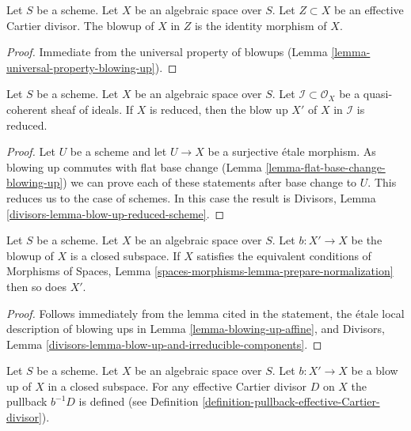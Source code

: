 \begin{lemma}
\label{lemma-blow-up-effective-Cartier-divisor}
Let $S$ be a scheme. Let $X$ be an algebraic space over $S$.
Let $Z \subset X$ be an effective Cartier divisor.
The blowup of $X$ in $Z$ is the identity morphism of $X$.
\end{lemma}

\begin{proof}
Immediate from the universal property of blowups
(Lemma \ref{lemma-universal-property-blowing-up}).
\end{proof}

\begin{lemma}
\label{lemma-blow-up-reduced-space}
Let $S$ be a scheme. Let $X$ be an algebraic space over $S$.
Let $\mathcal{I} \subset \mathcal{O}_X$ be a
quasi-coherent sheaf of ideals. If $X$ is reduced, then the
blow up $X'$ of $X$ in $\mathcal{I}$ is reduced.
\end{lemma}

\begin{proof}
Let $U$ be a scheme and let $U \to X$ be a surjective \'etale morphism.
As blowing up commutes with flat base change
(Lemma \ref{lemma-flat-base-change-blowing-up})
we can prove each of these statements after base change to $U$.
This reduces us to the case of schemes.
In this case the result is
Divisors, Lemma \ref{divisors-lemma-blow-up-reduced-scheme}.
\end{proof}

\begin{lemma}
\label{lemma-blowup-finite-nr-irreducibles}
Let $S$ be a scheme. Let $X$ be an algebraic space over $S$. Let
$b : X' \to X$ be the blowup of $X$ is a closed subspace. If
$X$ satisfies the equivalent conditions of
Morphisms of Spaces, Lemma \ref{spaces-morphisms-lemma-prepare-normalization}
then so does $X'$.
\end{lemma}

\begin{proof}
Follows immediately from the lemma cited in the statement,
the \'etale local description of blowing ups in
Lemma \ref{lemma-blowing-up-affine}, and
Divisors, Lemma \ref{divisors-lemma-blow-up-and-irreducible-components}.
\end{proof}

\begin{lemma}
\label{lemma-blow-up-pullback-effective-Cartier}
Let $S$ be a scheme. Let $X$ be an algebraic space over $S$.
Let $b : X' \to X$ be a blow up of $X$ in a closed subspace.
For any effective Cartier divisor $D$ on $X$ the pullback
$b^{-1}D$ is defined (see Definition
\ref{definition-pullback-effective-Cartier-divisor}).
\end{lemma}

